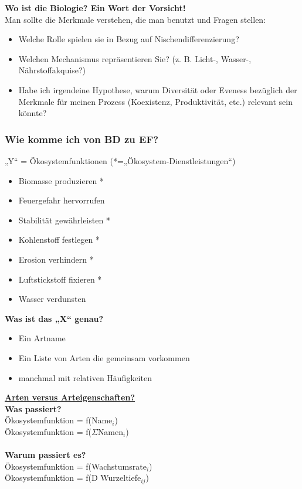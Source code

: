 \newpage
\textbf{Wo ist die Biologie? Ein Wort der Vorsicht!}\\
Man sollte die Merkmale verstehen, die man benutzt und Fragen stellen:
\begin{itemize}
	\item Welche Rolle spielen sie in Bezug auf Nischendifferenzierung?
	\item Welchen Mechanismus repräsentieren Sie? (z. B. Licht-, Wasser-, Nährstoffakquise?)
	\item Habe ich irgendeine Hypothese, warum Diversität oder Eveness bezüglich der Merkmale für meinen Prozess (Koexistenz, Produktivität, etc.) relevant sein könnte?
\end{itemize}

\subsubsection{Wie komme ich von BD zu EF?}
„Y“ = Ökosystemfunktionen (*=„Ökosystem-Dienstleistungen“)
\begin{itemize}
	\item Biomasse produzieren *
	\item Feuergefahr hervorrufen
	\item Stabilität gewährleisten *
	\item Kohlenstoff festlegen *
	\item Erosion verhindern *
	\item Luftstickstoff fixieren *
	\item Wasser verdunsten
\end{itemize}

\textbf{Was ist das „X“ genau?}\\
\begin{itemize}
	\item Ein Artname
	\item Ein Liste von Arten die gemeinsam vorkommen
	\item manchmal mit relativen Häufigkeiten
\end{itemize}

\underline{\textbf{Arten versus Arteigenschaften?}}\\
\textbf{Was passiert?}\\
Ökosystemfunktion = f(Name$_i$)\\
Ökosystemfunktion = f($\Sigma$Namen$_i$)
\\\\
\textbf{Warum passiert es?}\\
Ökosystemfunktion = f(Wachstumsrate$_i$)\\
Ökosystemfunktion = f(D Wurzeltiefe$_{ij}$)\\

